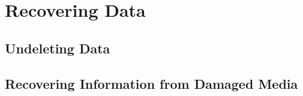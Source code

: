 \section{Recovering Data}
\subsection{Undeleting Data}

\subsection{Recovering Information from Damaged Media}

